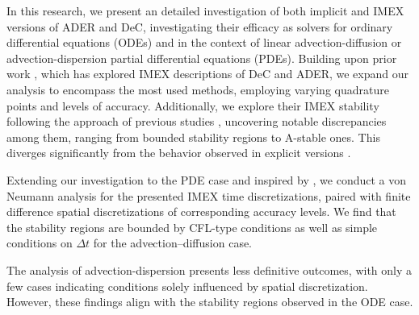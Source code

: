 In this research, we present an detailed investigation of both implicit and IMEX versions of ADER and DeC, investigating their efficacy as solvers for ordinary differential equations (ODEs) and in the context of linear  advection-diffusion or advection-dispersion partial differential equations (PDEs).
Building upon prior work \cite{Han_Veiga_2021, minion2003dec, abgrall2018asymptotic, dumbser2007FVStiff}, which has explored IMEX descriptions of DeC and ADER, we expand our analysis to encompass the most used methods, employing varying quadrature points and levels of accuracy. Additionally, we explore their IMEX stability following the approach of previous studies \cite{Hundsdorfer,liotta2000central, minion2003dec}, uncovering notable discrepancies among them, ranging from bounded stability regions to A-stable ones. This diverges significantly from the behavior observed in explicit versions \cite{Han_Veiga_2021}.

Extending our investigation to the PDE case and inspired by  \cite{TanChenShu_ImEx_Stability}, 
we conduct a von Neumann analysis for the presented IMEX time discretizations, paired with finite difference spatial discretizations of corresponding accuracy levels.
We find that the stability regions are bounded by CFL-type conditions as well as simple conditions on $\Delta t$ for the advection--diffusion case. 
 

The analysis of advection-dispersion presents less definitive outcomes, with only a few cases indicating conditions solely influenced by spatial discretization. However, these findings align with the stability regions observed in the ODE case.


